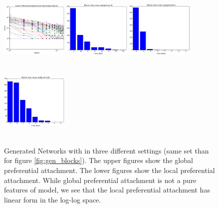 \begin{figure}[h]
	\endminipage
	\includegraphics[width=3.2cm, height=3.7cm]{img/M_g_regular/figure_3}
	\endminipage
		\vspace{-0.4cm}
	\includegraphics[width=3.2cm, height=3.7cm]{img/M_g_peaks/figure_5}
	\endminipage
	\includegraphics[width=3.2cm, height=3.7cm]{img/M_g_power_law/figure_5} 
	\endminipage
	\includegraphics[width=3.2cm, height=3.7cm]{img/M_g_regular/figure_5}
	\endminipage
	\caption{Generated Networks with in three different settings (same set than for figure \ref{fig:gen_blocks}). The upper figures show the global preferential attachment. The lower figures show the local preferential attachment. While global preferential attachment is not a pure features of model, we see that the local preferential attachment has linear form in the log-log space.}
	\label{fig:gen_burst_mmsb}
\end{figure}



